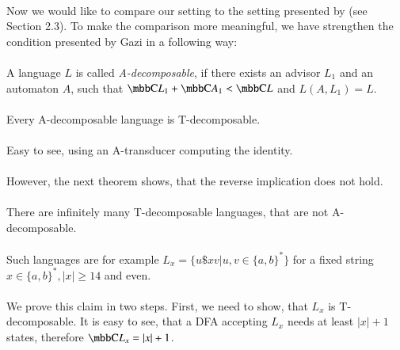 \paragraph{}
Now we would like to compare our setting to the setting presented by \cite{Gazi} (see Section 2.3). To make the comparison more meaningful, we have strengthen the condition presented by Gazi in a following way:

\paragraph{}
\cdefinicia A language $L$ is called \emph{A-decomposable}, if there exists an advisor $L_1$ and an automaton $A$, such that $\C{L_1} + \C{A_1} < \C{L}$ and $L(A, L_1) = L$.

\paragraph{}
\cveta Every A-decomposable language is T-decomposable.

\paragraph{}
\dokaz Easy to see, using an A-transducer computing the identity. \square

\paragraph{}
However, the next theorem shows, that the reverse implication does not hold.

\paragraph{}
\cveta There are infinitely many T-decomposable languages, that are not A-decomposable.

\paragraph{}
\dokaz Such languages are for example $L_{x} = \{ u\$ xv | u,v \in \{ a,b\}^* \}$ for a fixed string $x \in \{ a,b\}^*, |x| \geq 14$ and even.

\paragraph{}
We prove this claim in two steps. First, we need to show, that $L_{x}$ is T-decomposable. It is easy to see, that  a DFA accepting $L_{x}$ needs at least $|x| + 1$ states, therefore $\C{L_x} = |x|+1$.

